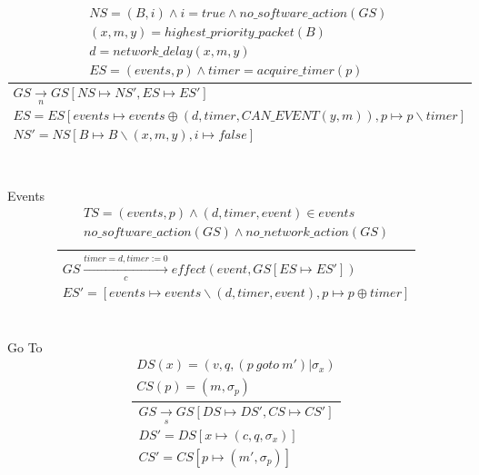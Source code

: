\documentclass[]{article}
\begin{document}
\begin{equation}
\frac
{
	\begin{gathered}
	NS = (B,i) \wedge i = true \wedge  no\_software\_action(GS) \ \\
	(x,m,y) = highest\_priority\_packet(B) \\ 
	d = network\_delay(x,m,y)  \\ 
	ES = (events,p) \wedge timer = acquire\_timer(p)
	\end{gathered}
}
{
	\begin{gathered}
	GS\xrightarrow[n]{}GS[NS\longmapsto NS',ES\longmapsto ES']  \\
	ES= ES[events \longmapsto events\oplus (d,timer,CAN\_EVENT(y,m)), p \longmapsto p \backslash timer]  \\
	 NS'= NS[B \longmapsto B\backslash(x,m,y), i \longmapsto false ] \\
	\end{gathered}
}
\end{equation}
\\\\
Events
\begin{equation}
\frac
{
	\begin{gathered}
	TS= (events,p) \wedge (d,timer,event) \in events  \\
	no\_software\_action(GS) \wedge no\_network\_action(GS) \\
	\end{gathered}
}
{
	\begin{gathered}
	GS\xrightarrow[c]{timer = d, timer:=0} effect(event,GS[ES\longmapsto ES']) \\
	ES'= [events \longmapsto events \backslash (d,timer,event), p\longmapsto p \oplus timer ]
	\end{gathered}
}
\end{equation}
\\\\
Go To
\begin{equation}\label{GoTo}
\frac
{
	\begin{gathered}
	DS(x)=(v,q,(p \ goto \ m')|\sigma_x) \\
	 CS(p)=(m,\sigma_p)
	\end{gathered}
}
{
	\begin{gathered}
	GS\xrightarrow[s]{}GS[DS\longmapsto DS', CS\longmapsto CS']  \\
	DS'=DS[x\longmapsto(c,q,\sigma_x)]  \\ 
	CS'=CS[p\longmapsto (m',\sigma_p)]
	\end{gathered}
}
\end{equation}
\end{document}
